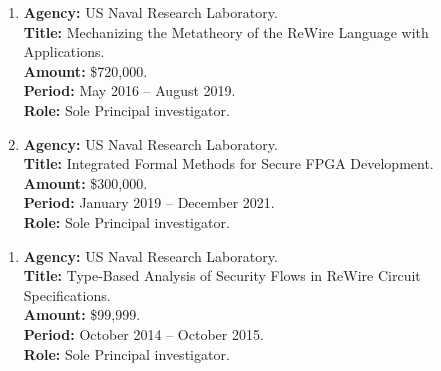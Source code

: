 \documentclass[11pt]{article}
\begin{document}

\begin{enumerate}[leftmargin=0.0mm]
\item
{\bf Agency:} US Naval Research Laboratory.
\\
{\bf Title:} Mechanizing the Metatheory of the ReWire Language with Applications.
\\
{\bf Amount:} \$720,000.
\\
{\bf Period:}   May 2016  --  August 2019.
\\
{\bf Role:}    Sole  Principal investigator.

\item
{\bf Agency:} US Naval Research Laboratory.
\\
{\bf Title:} Integrated Formal Methods for Secure FPGA Development.
\\
{\bf Amount:} \$300,000.
\\
{\bf Period:}   January 2019  --  December 2021.
\\
{\bf Role:}    Sole  Principal investigator.
\end{enumerate}



\begin{enumerate}[leftmargin=0.0mm]
\item
{\bf Agency:} US Naval Research Laboratory.
\\
{\bf Title:} Type-Based Analysis of Security Flows in ReWire Circuit Specifications.
\\
{\bf Amount:} \$99,999.
\\
{\bf Period:}   October 2014  --  October 2015.
\\
{\bf Role:}     Sole Principal investigator.



\end{enumerate}

\newpage
\end{document}
